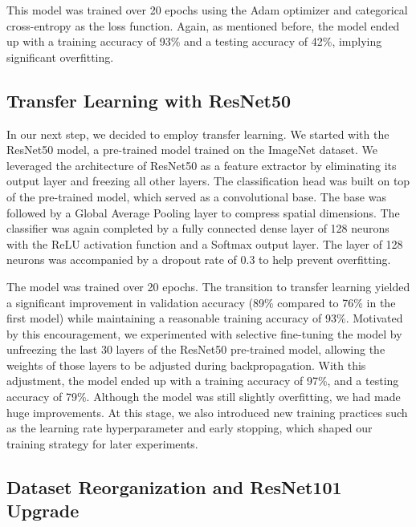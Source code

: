 \documentclass[conference]{IEEEtran}
\begin{document}
This model was trained over 20 epochs using the Adam optimizer and categorical cross-entropy as the loss function. Again, as mentioned before, the model ended up with a training accuracy of 93\% and a testing accuracy of 42\%, implying significant overfitting.

\subsection{\large Transfer Learning with ResNet50}

In our next step, we decided to employ transfer learning. We started with the ResNet50 model, a pre-trained model trained on the ImageNet dataset. We leveraged the architecture of ResNet50 as a feature extractor by eliminating its output layer and freezing all other layers. The classification head was built on top of the pre-trained model, which served as a convolutional base. The base was followed by a Global Average Pooling layer to compress spatial dimensions. The classifier was again completed by a fully connected dense layer of 128 neurons with the ReLU activation function and a Softmax output layer. The layer of 128 neurons was accompanied by a dropout rate of 0.3 to help prevent overfitting.

The model was trained over 20 epochs. The transition to transfer learning yielded a significant improvement in validation accuracy (89\% compared to 76\% in the first model) while maintaining a reasonable training accuracy of 93\%. Motivated by this encouragement, we experimented with selective fine-tuning the model by unfreezing the last 30 layers of the ResNet50 pre-trained model, allowing the weights of those layers to be adjusted during backpropagation. With this adjustment, the model ended up with a training accuracy of 97\%, and a testing accuracy of 79\%. Although the model was still slightly overfitting, we had made huge improvements. At this stage, we also introduced new training practices such as the learning rate hyperparameter and early stopping, which shaped our training strategy for later experiments.

\subsection{\large Dataset Reorganization and ResNet101 Upgrade}
\end{document}
